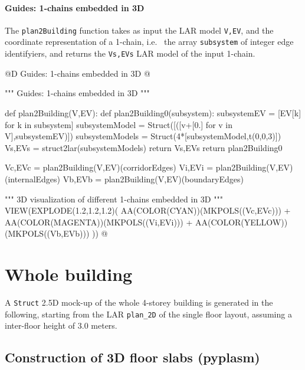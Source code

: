 \documentclass[11pt,oneside]{article}    %
\begin{document}
\paragraph{Guides: 1-chains embedded in 3D}

The \texttt{plan2Building} function takes as input the LAR model \texttt{V,EV}, and the coordinate representation of a 1-chain, i.e.~ the array \texttt{subsystem} of integer edge identifyiers, and returns the \texttt{Vs,EVs} LAR model of the input 1-chain.

@D Guides: 1-chains embedded in 3D
@{""" Guides: 1-chains embedded in 3D """

def plan2Building(V,EV):
    def plan2Building0(subsystem):
        subsystemEV = [EV[k] for k in subsystem]
        subsystemModel = Struct([([v+[0.] for v in V],subsystemEV)])
        subsystemModels = Struct(4*[subsystemModel,t(0,0,3)])
        Vs,EVs = struct2lar(subsystemModels)
        return Vs,EVs
    return plan2Building0

Vc,EVc = plan2Building(V,EV)(corridorEdges)
Vi,EVi = plan2Building(V,EV)(internalEdges)
Vb,EVb = plan2Building(V,EV)(boundaryEdges)

""" 3D visualization of different 1-chains embedded in 3D """
VIEW(EXPLODE(1.2,1.2,1.2)(
    AA(COLOR(CYAN))(MKPOLS((Vc,EVc))) + AA(COLOR(MAGENTA))(MKPOLS((Vi,EVi))) +
    AA(COLOR(YELLOW))(MKPOLS((Vb,EVb))) ))
@}

\section{Whole building}

A \texttt{Struct} 2.5D mock-up of the whole 4-storey building is generated in the following, starting from the LAR \texttt{plan\_2D} of the single floor layout, assuming a inter-floor height of 3.0 meters. 



\subsection{Construction of 3D floor slabs (pyplasm)}
\end{document}
